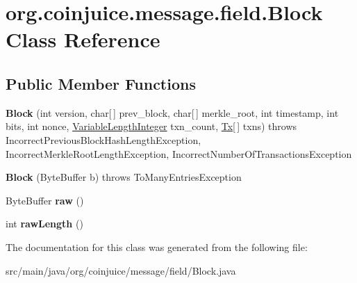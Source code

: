 \hypertarget{classorg_1_1coinjuice_1_1message_1_1field_1_1_block}{\section{org.\-coinjuice.\-message.\-field.\-Block Class Reference}
\label{classorg_1_1coinjuice_1_1message_1_1field_1_1_block}
}
\subsection*{Public Member Functions}
\begin{DoxyCompactItemize}
\item 
\hypertarget{classorg_1_1coinjuice_1_1message_1_1field_1_1_block_abd028cb76757c73f880c5db9ce2cf046}{{\bfseries Block} (int version, char\mbox{[}$\,$\mbox{]} prev\-\_\-block, char\mbox{[}$\,$\mbox{]} merkle\-\_\-root, int timestamp, int bits, int nonce, \hyperlink{classorg_1_1coinjuice_1_1message_1_1field_1_1_variable_length_integer}{Variable\-Length\-Integer} txn\-\_\-count, \hyperlink{classorg_1_1coinjuice_1_1message_1_1field_1_1_tx}{Tx}\mbox{[}$\,$\mbox{]} txns)  throws Incorrect\-Previous\-Block\-Hash\-Length\-Exception, Incorrect\-Merkle\-Root\-Length\-Exception, Incorrect\-Number\-Of\-Transactions\-Exception }\label{classorg_1_1coinjuice_1_1message_1_1field_1_1_block_abd028cb76757c73f880c5db9ce2cf046}

\item 
\hypertarget{classorg_1_1coinjuice_1_1message_1_1field_1_1_block_a1d2c046f1c9bd224cf99c4d21f9301d1}{{\bfseries Block} (Byte\-Buffer b)  throws To\-Many\-Entries\-Exception }\label{classorg_1_1coinjuice_1_1message_1_1field_1_1_block_a1d2c046f1c9bd224cf99c4d21f9301d1}

\item 
\hypertarget{classorg_1_1coinjuice_1_1message_1_1field_1_1_block_a58e6a25c131c0505cb8febcbfb660ee6}{Byte\-Buffer {\bfseries raw} ()}\label{classorg_1_1coinjuice_1_1message_1_1field_1_1_block_a58e6a25c131c0505cb8febcbfb660ee6}

\item 
\hypertarget{classorg_1_1coinjuice_1_1message_1_1field_1_1_block_a3acab2f77751e3ddaa99a9b1c84e7a3c}{int {\bfseries raw\-Length} ()}\label{classorg_1_1coinjuice_1_1message_1_1field_1_1_block_a3acab2f77751e3ddaa99a9b1c84e7a3c}

\end{DoxyCompactItemize}


The documentation for this class was generated from the following file\-:\begin{DoxyCompactItemize}
\item 
src/main/java/org/coinjuice/message/field/Block.\-java\end{DoxyCompactItemize}
